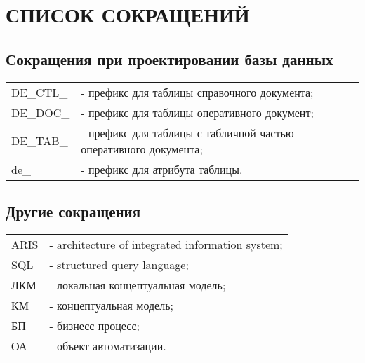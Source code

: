 {}
\section*{СПИСОК СОКРАЩЕНИЙ}

{}
\subsection*{Сокращения при проектировании базы данных}

\begin{tabular}{p{2cm}l}
    DE\_CTL\_   & - префикс для таблицы справочного документа; \\
    DE\_DOC\_   & - префикс для таблицы оперативного документ; \\
    DE\_TAB\_   & - префикс для таблицы с табличной частью оперативного документа; \\
    de\_        & - префикс для атрибута таблицы. \\
\end{tabular}

{}
\subsection*{Другие сокращения}

\begin{tabular}{p{2cm}l}
    ARIS    & - architecture of integrated information system;\\
    SQL     & - structured query language;\\
    ЛКМ     & - локальная концептуальная модель;\\ 
    КМ      & - концептуальная модель;\\
    БП      & - бизнесс процесс;\\
    ОА      & - объект автоматизации.\\
\end{tabular}

\newpage
